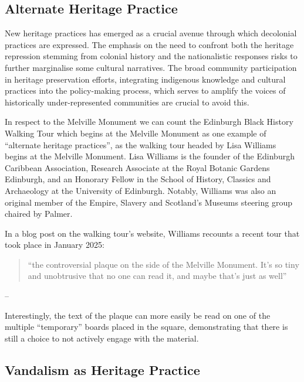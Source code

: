 \documentclass{scrartcl}
\renewcommand{\cite}{\parencite}
\begin{document}
\subsection{Alternate Heritage Practice}

New heritage practices has emerged as a crucial avenue through which decolonial practices are expressed. The emphasis on the need to confront both the heritage repression stemming from colonial history and the nationalistic responses risks to further marginalise some cultural narratives. The broad community participation in heritage preservation efforts, integrating indigenous knowledge and cultural practices into the policy-making process, which serves to amplify the voices of historically under-represented communities are crucial to avoid this. 

In respect to the Melville Monument we can count the Edinburgh Black History Walking Tour which begins at the Melville Monument as one example of ``alternate heritage practices'', as the  walking tour headed by Lisa Williams begins at the Melville Monument. 
Lisa Williams is the founder of the Edinburgh Caribbean Association, Research Associate at the Royal Botanic Gardens Edinburgh, and an Honorary Fellow in the School of History, Classics and Archaeology at the University of Edinburgh. Notably, Williams was also an original member of the Empire, Slavery and Scotland's Museums steering group chaired by Palmer.

In a blog post on the walking tour's website, Williams recounts a recent tour that took place in January 2025:

\begin{quotation}
    ``the controversial plaque on the side of the Melville Monument. It's so tiny and unobtrusive that no one can read it, and maybe that's just as well''
\end{quotation}
\begin{flushright}
    -- \cite[][]{williams_2025}
\end{flushright}

Interestingly, the text of the plaque can more easily be read on one of the multiple ``temporary'' boards placed in the square, demonstrating that there is still a choice to not actively engage with the material.

\subsection{Vandalism as Heritage Practice}
\end{document}

